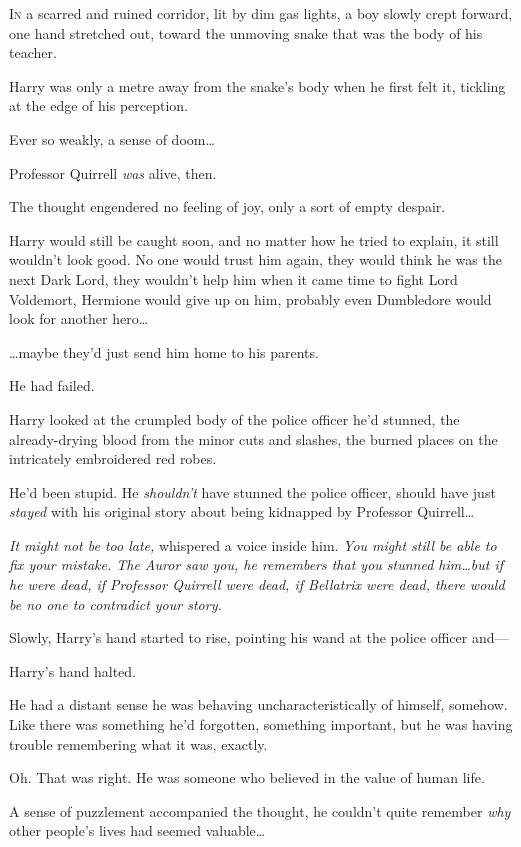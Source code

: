 
\lettrine{I}{n} a scarred and
ruined corridor, lit by dim gas lights, a boy slowly crept forward, one hand
stretched out, toward the unmoving snake that was the body of his teacher.

Harry was only a metre away from the snake's body when he first felt it,
tickling at the edge of his perception.

Ever so weakly, a sense of doom…

Professor Quirrell \emph{was} alive, then.

The thought engendered no feeling of joy, only a sort of empty despair.

Harry would still be caught soon, and no matter how he tried to explain, it
still wouldn't look good. No one would trust him again, they would think he was
the next Dark Lord, they wouldn't help him when it came time to fight Lord
Voldemort, Hermione would give up on him, probably even Dumbledore would look
for another hero…

…maybe they'd just send him home to his parents.

He had failed.

Harry looked at the crumpled body of the police officer he'd stunned, the
already-drying blood from the minor cuts and slashes, the burned places on the
intricately embroidered red robes.

He'd been stupid. He \emph{shouldn't} have stunned the police officer, should
have just \emph{stayed} with his original story about being kidnapped by
Professor Quirrell…

\emph{It might not be too late,} whispered a voice inside him. \emph{You might
still be able to fix your mistake. The Auror saw you, he remembers that you
stunned him…but if he were dead, if Professor Quirrell were dead, if
Bellatrix were dead, there would be no one to contradict your story.}

Slowly, Harry's hand started to rise, pointing his wand at the police officer
and—

Harry's hand halted.

He had a distant sense he was behaving uncharacteristically of himself,
somehow. Like there was something he'd forgotten, something important, but he
was having trouble remembering what it was, exactly.

Oh. That was right. He was someone who believed in the value of human life.

A sense of puzzlement accompanied the thought, he couldn't quite remember
\emph{why} other people's lives had seemed valuable…

